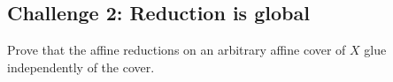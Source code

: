 \subsection*{Challenge 2: Reduction is global}
\begin{problem}\label{chal:vi22-02}
Prove that the affine reductions on an arbitrary affine cover of $X$ glue independently of the cover.
\end{problem}

